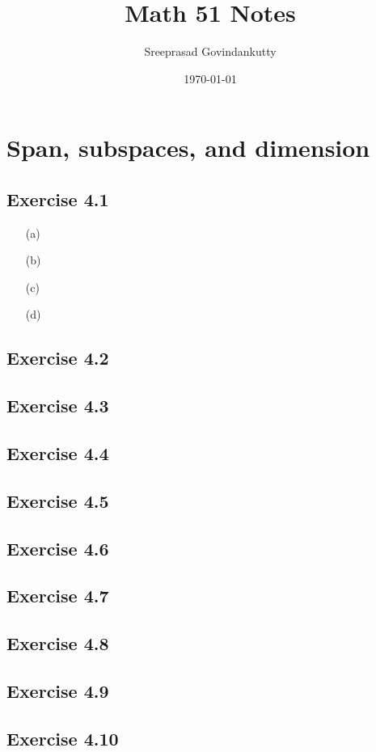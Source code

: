 \documentclass[11pt]{article}
\title{Math 51 Notes}
\author{Sreeprasad Govindankutty}
\date{\today}
\theoremstyle{definition}
\theoremstyle{remark}
\begin{document}
\maketitle
\tableofcontents
\newpage

\section{Span, subspaces, and dimension}

\subsection{Exercise 4.1}

\begin{enumerate}
    \item[(a)] 
    \item[(b)] 
    \item[(c)] 
    \item[(d)] 
\end{enumerate}

\subsection{Exercise 4.2}

\subsection{Exercise 4.3}

\subsection{Exercise 4.4}

\subsection{Exercise 4.5}

\subsection{Exercise 4.6}

\subsection{Exercise 4.7}

\subsection{Exercise 4.8}

\subsection{Exercise 4.9}

\subsection{Exercise 4.10}

\end{document}
